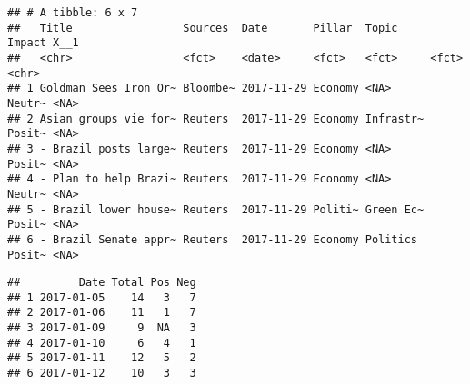 \documentclass[]{article}
\newenvironment{Shaded}{\begin{snugshade}}{\end{snugshade}}
\newcommand{\KeywordTok}[1]{\textcolor[rgb]{0.13,0.29,0.53}{\textbf{#1}}}
\newcommand{\DataTypeTok}[1]{\textcolor[rgb]{0.13,0.29,0.53}{#1}}
\newcommand{\StringTok}[1]{\textcolor[rgb]{0.31,0.60,0.02}{#1}}
\newcommand{\CommentTok}[1]{\textcolor[rgb]{0.56,0.35,0.01}{\textit{#1}}}
\newcommand{\OtherTok}[1]{\textcolor[rgb]{0.56,0.35,0.01}{#1}}
\newcommand{\OperatorTok}[1]{\textcolor[rgb]{0.81,0.36,0.00}{\textbf{#1}}}
\newcommand{\NormalTok}[1]{#1}
\begin{document}
\begin{verbatim}
## # A tibble: 6 x 7
##   Title                 Sources  Date       Pillar  Topic     Impact X__1 
##   <chr>                 <fct>    <date>     <fct>   <fct>     <fct>  <chr>
## 1 Goldman Sees Iron Or~ Bloombe~ 2017-11-29 Economy <NA>      Neutr~ <NA> 
## 2 Asian groups vie for~ Reuters  2017-11-29 Economy Infrastr~ Posit~ <NA> 
## 3 - Brazil posts large~ Reuters  2017-11-29 Economy <NA>      Posit~ <NA> 
## 4 - Plan to help Brazi~ Reuters  2017-11-29 Economy <NA>      Neutr~ <NA> 
## 5 - Brazil lower house~ Reuters  2017-11-29 Politi~ Green Ec~ Posit~ <NA> 
## 6 - Brazil Senate appr~ Reuters  2017-11-29 Economy Politics  Posit~ <NA>
\end{verbatim}

\begin{Shaded}
\end{Shaded}

\begin{verbatim}
##         Date Total Pos Neg
## 1 2017-01-05    14   3   7
## 2 2017-01-06    11   1   7
## 3 2017-01-09     9  NA   3
## 4 2017-01-10     6   4   1
## 5 2017-01-11    12   5   2
## 6 2017-01-12    10   3   3
\end{verbatim}
\end{document}
